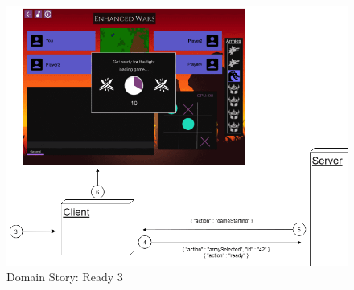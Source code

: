 \documentclass[12pt, titlepage]{scrartcl}
\begin{document}
		    	\begin{figure}[H] 
		    		\centering
		    		\includegraphics[width=\textwidth]{images/domain_stories/readyStory3.png}
		    		\caption{Domain Story: Ready 3}
		    		\label{Domain_Story_Ready_3}
		    	\end{figure}
\end{document}
